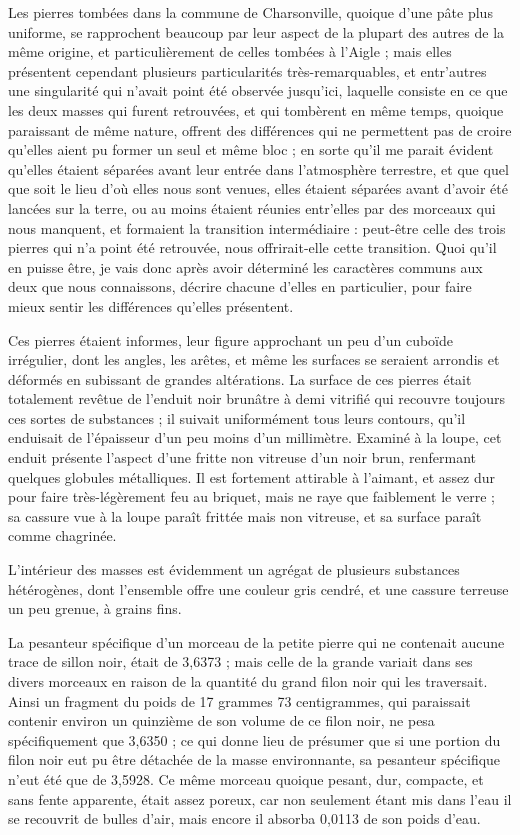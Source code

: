 \documentclass[a4paper, 12pt, oneside, french]{article}
\begin{document}
Les pierres tombées dans la commune de Charsonville, quoique d'une pâte plus uniforme, se rapprochent beaucoup par leur aspect de la plupart des autres de la même origine, et particulièrement de celles tombées à l'Aigle ; mais elles présentent cependant plusieurs particularités très-remarquables, et entr'autres une singularité qui n'avait point été observée jusqu'ici, laquelle consiste en ce que les deux masses qui furent retrouvées, et qui tombèrent en même temps, quoique paraissant de même nature, offrent des différences qui ne permettent pas de croire qu'elles aient pu former un seul et même bloc ; en sorte qu'il me parait évident qu'elles étaient séparées avant leur entrée dans l'atmosphère terrestre, et que quel que soit le lieu d'où elles nous sont venues, elles étaient séparées avant d'avoir été lancées sur la terre, ou au moins étaient réunies entr'elles par des morceaux qui nous manquent, et formaient la transition intermédiaire : peut-être celle des trois pierres qui n'a point été retrouvée, nous offrirait-elle cette transition. Quoi qu'il en puisse être, je vais donc après avoir déterminé les caractères communs aux deux que nous connaissons, décrire chacune d'elles en particulier, pour faire mieux sentir les différences qu'elles présentent.

Ces pierres étaient informes, leur figure approchant un peu d'un cuboïde irrégulier, dont les angles, les arêtes, et même les surfaces se seraient arrondis et déformés en subissant de grandes altérations. La surface de ces pierres était totalement revêtue de l'enduit noir brunâtre à demi vitrifié qui recouvre toujours ces sortes de substances ; il suivait uniformément tous leurs contours, qu'il enduisait de l'épaisseur d'un peu moins d'un millimètre. Examiné à la loupe, cet enduit présente l'aspect d'une fritte non vitreuse d'un noir brun, renfermant quelques globules métalliques. Il est fortement attirable à l'aimant, et assez dur pour faire très-légèrement feu au briquet, mais ne raye que faiblement le verre ; sa cassure vue à la loupe paraît frittée mais non vitreuse, et sa surface paraît comme chagrinée.

L'intérieur des masses est évidemment un agrégat de plusieurs substances hétérogènes, dont l'ensemble offre une couleur gris cendré, et une cassure terreuse un peu grenue, à grains fins.

La pesanteur spécifique d'un morceau de la petite pierre qui ne contenait aucune trace de sillon noir, était de 3,6373 ; mais celle de la grande variait dans ses divers morceaux en raison de la quantité du grand filon noir qui les traversait. Ainsi un fragment du poids de 17 grammes 73 centigrammes, qui paraissait contenir environ un quinzième de son volume de ce filon noir, ne pesa spécifiquement que 3,6350 ; ce qui donne lieu de présumer que si une portion du filon noir eut pu être détachée de la masse environnante, sa pesanteur spécifique n'eut été que de 3,5928. Ce même morceau quoique pesant, dur, compacte, et sans fente apparente, était assez poreux, car non seulement étant mis dans l'eau il se recouvrit de bulles d'air, mais encore il absorba 0,0113 de son poids d'eau.
\end{document}
